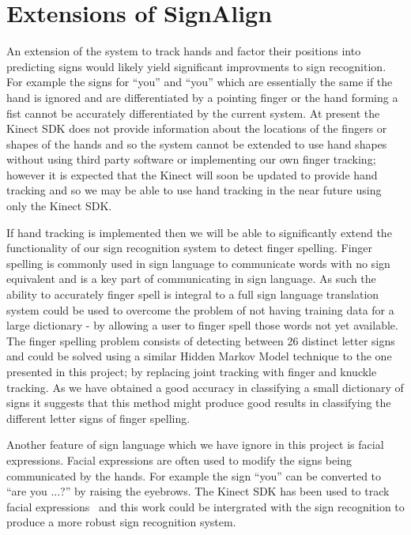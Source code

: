 \section{Extensions of SignAlign}
An extension of the system to track hands and factor their positions into predicting signs would likely yield significant improvments to sign recognition. For example the signs for ``you'' and ``you'' which are essentially the same if the hand is ignored and are differentiated by a pointing finger or the hand forming a fist cannot be accurately differentiated by the current system. At present the Kinect SDK does not provide information about the locations of the fingers or shapes of the hands and so the system cannot be extended to use hand shapes without using third party software or implementing our own finger tracking; however it is expected that the Kinect will soon be updated to provide hand tracking and so we may be able to use hand tracking in the near future using only the Kinect SDK.

If hand tracking is implemented then we will be able to significantly extend the functionality of our sign recognition system to detect finger spelling. Finger spelling is commonly used in sign language to communicate words with no sign equivalent and is a key part of communicating in sign language. As such the ability to accurately finger spell is integral to a full sign language translation system could be used to overcome the problem of not having training data for a large dictionary - by allowing a user to finger spell those words not yet available. The finger spelling problem consists of detecting between 26 distinct letter signs and could be solved using a similar Hidden Markov Model technique to the one presented in this project; by replacing joint tracking with finger and knuckle tracking. As we have obtained a good accuracy in classifying a small dictionary of signs it suggests that this method might produce good results in classifying the different letter signs of finger spelling.

Another feature of sign language which we have ignore in this project is facial expressions. Facial expressions are often used to modify the signs being communicated by the hands. For example the sign ``you'' can be converted to ``are you ...?'' by raising the eyebrows. The Kinect SDK has been used to track facial expressions~\citep{Microsoft:2013:Face} and this work could be intergrated with the sign recognition to produce a more robust sign recognition system.



